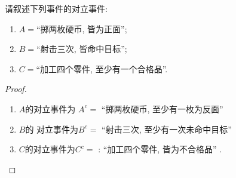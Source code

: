 \documentclass[../main.tex]{subfiles}
\begin{document}
\begin{exercise}{}{}
请叙述下列事件的对立事件:
\begin{enumerate}
    \item $A=$“掷两枚硬币, 皆为正面”;
    \item $B=$“射击三次, 皆命中目标”;
    \item $C=$“加工四个零件, 至少有一个合格品”.
\end{enumerate}
\end{exercise}
\begin{proof}
    \begin{enumerate}
        \item \(  A  \)的对立事件为 \(  A^{c}=   \)  ``掷两枚硬币, 至少有一枚为反面''
         \item \(  B  \)的 对立事件为\(  B^{c}=   \)  ``射击三次, 至少有一次未命中目标''
         \item \(  C  \)的对立事件为\(  C^{c}=   \) : ``加工四个零件, 皆为不合格品'' .
    \end{enumerate}
    
\end{proof}
\end{document}
